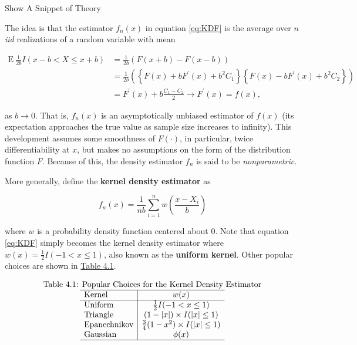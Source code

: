 \documentclass[]{book}
\theoremstyle{definition}
\theoremstyle{definition}
\theoremstyle{definition}
\theoremstyle{remark}
\begin{document}
Show A Snippet of Theory

\hypertarget{Theorykerneldensity}{}
The idea is that the estimator \(f_n(x)\) in equation \eqref{eq:KDF} is
the average over \(n\) \emph{iid} realizations of a random variable with
mean

\[\begin{aligned}
\mathrm{E~ } \frac{1}{2b} I(x-b < X \le x + b) &=  \frac{1}{2b}\left(F(x+b)-F(x-b)\right) \\
&=  \frac{1}{2b} \left( \left\{ F(x) + b F^{\prime}(x) + b^2 C_1\right\}
\left\{ F(x) - b F^{\prime}(x) + b^2 C_2\right\} \right) \\
&=  F^{\prime}(x) + b \frac{C_1-C_2}{2} \rightarrow  F^{\prime}(x) = f(x),
\end{aligned}\]

as \(b\rightarrow 0\). That is, \(f_n(x)\) is an asymptotically unbiased
estimator of \(f(x)\) (its expectation approaches the true value as
sample size increases to infinity). This development assumes some
smoothness of \(F(\cdot)\), in particular, twice differentiability at
\(x\), but makes no assumptions on the form of the distribution function
\(F\). Because of this, the density estimator \(f_n\) is said to be
\emph{nonparametric}.

More generally, define the \textbf{kernel density estimator} as

\begin{equation} 
  f_n(x) = \frac{1}{nb} \sum_{i=1}^n w\left(\frac{x-X_i}{b}\right)
  \label{eq:kernelDens}
\end{equation}

where \(w\) is a probability density function centered about 0. Note
that equation \eqref{eq:KDF} simply becomes the kernel density estimator
where \(w(x) = \frac{1}{2}I(-1 < x \le 1)\), also known as the
\textbf{uniform kernel}. Other popular choices are shown in
\protect\hyperlink{tab:41}{Table 4.1}.

\[\begin{matrix}
\text{Table 4.1: Popular Choices for the Kernel Density Estimator}\\
\begin{array}{l|cc}
\hline
\text{Kernel} &  w(x) \\
\hline 
\text{Uniform } &  \frac{1}{2}I(-1 < x \le 1) \\
\text{Triangle} &  (1-|x|)\times I(|x| \le 1) \\
\text{Epanechnikov} & \frac{3}{4}(1-x^2) \times I(|x| \le 1) \\
\text{Gaussian} & \phi(x) \\
\hline
\end{array}\end{matrix}\]
\end{document}

